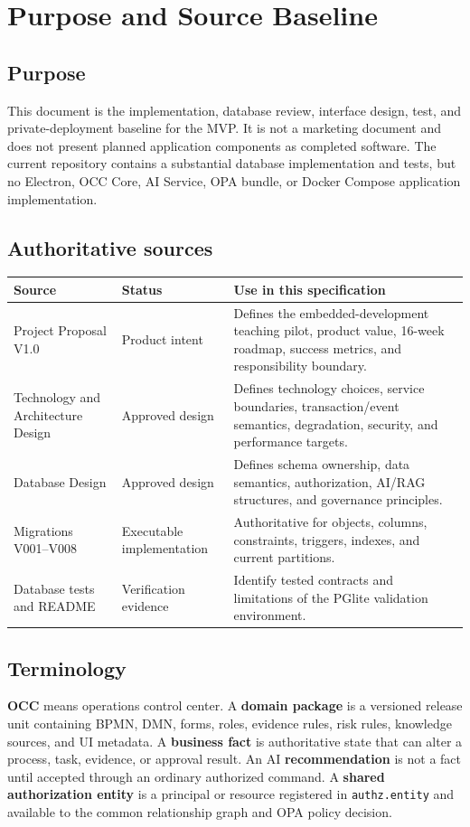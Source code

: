 \documentclass[journal,a4paper,onecolumn]{IEEEtran}
\begin{document}
\tableofcontents
\clearpage

\section{Purpose and Source Baseline}
\subsection{Purpose}
This document is the implementation, database review, interface design, test, and private-deployment baseline for the MVP. It is not a marketing document and does not present planned application components as completed software. The current repository contains a substantial database implementation and tests, but no Electron, OCC Core, AI Service, OPA bundle, or Docker Compose application implementation.

\subsection{Authoritative sources}
\begin{longtable}{p{}p{}p{}}
\toprule
Source & Status & Use in this specification \\
\midrule
\endhead
Project Proposal V1.0 & Product intent & Defines the embedded-development teaching pilot, product value, 16-week roadmap, success metrics, and responsibility boundary.\\
Technology and Architecture Design & Approved design & Defines technology choices, service boundaries, transaction/event semantics, degradation, security, and performance targets.\\
Database Design & Approved design & Defines schema ownership, data semantics, authorization, AI/RAG structures, and governance principles.\\
Migrations V001--V008 & Executable implementation & Authoritative for objects, columns, constraints, triggers, indexes, and current partitions.\\
Database tests and README & Verification evidence & Identify tested contracts and limitations of the PGlite validation environment.\\
\bottomrule
\end{longtable}

\subsection{Terminology}
\textbf{OCC} means operations control center. A \textbf{domain package} is a versioned release unit containing BPMN, DMN, forms, roles, evidence rules, risk rules, knowledge sources, and UI metadata. A \textbf{business fact} is authoritative state that can alter a process, task, evidence, or approval result. An AI \textbf{recommendation} is not a fact until accepted through an ordinary authorized command. A \textbf{shared authorization entity} is a principal or resource registered in \texttt{authz.entity} and available to the common relationship graph and OPA policy decision.
\end{document}
